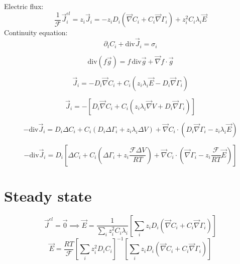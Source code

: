 \documentclass[aps,12pt]{revtex4}
\begin{document}
Electric flux:
\begin{equation}
	\dfrac{1}{\mathcal{F}} \vec{J}_i^{el} =  z_i \vec{J}_i = - z_i D_i \left( \vec{\nabla} C_i + C_i \vec{\nabla}\Gamma_i \right) + z_i^2 C_i \lambda_i \vec{E}
\end{equation}
Continuity equation:
\begin{equation}
	\partial_t C_i + \mathrm{div} \vec{J}_i = \sigma_i
\end{equation}

\begin{equation}
	\mathrm{div}(f\vec{g}) = f \, \mathrm{div}\vec{g} + \vec{\nabla} f \cdot \vec{g}
\end{equation}

\begin{equation}
	\vec{J}_i = -D_i \vec{\nabla} C_i + C_i \left( z_i \lambda_i \vec{E} - D_i \vec{\nabla}\Gamma_i \right)
\end{equation}

\begin{equation}
	\vec{J}_i = - \left[ D_i \vec{\nabla} C_i + C_i \left( z_i \lambda_i \vec{\nabla} V + D_i \vec{\nabla}\Gamma_i \right) \right]
\end{equation}

\begin{equation}
	-\mathrm{div} \vec{J}_i = D_i \Delta C_i + C_i \left( D_i \Delta \Gamma_i + z_i \lambda_i \Delta V \right)
	+ \vec{\nabla} C_i \cdot \left(  D_i \vec{\nabla}\Gamma_i - z_i \lambda_i \vec{E} \right) 
\end{equation}

\begin{equation}
	-\mathrm{div} \vec{J}_i =
	 D_i \left[ \Delta C_i + C_i \left(\Delta \Gamma_i +  z_i \dfrac{\mathcal{F}\Delta V}{RT} \right) 
	+ \vec{\nabla}C_i \cdot \left( \vec{\nabla} \Gamma_i - z_i \dfrac{\mathcal{F}}{RT} \vec{E} \right) \right] 
\end{equation}

\section{Steady state}

\begin{equation}
\vec{J}^{el} = \vec{0} \implies \vec{E} = \dfrac{1}{ \sum_i z_i^2 C_i \lambda_i } \left[\sum_i  z_i D_i \left( \vec{\nabla} C_i + C_i \vec{\nabla}\Gamma_i \right)\right]
\end{equation}
\begin{equation}
	\vec{E} = \dfrac{RT}{\mathcal{F}} \left[\sum_i z_i^2 D_i C_i \right]^{-1} 
	\left[\sum_i  z_i D_i \left( \vec{\nabla} C_i + C_i \vec{\nabla}\Gamma_i \right)\right]
\end{equation}
\end{document}
